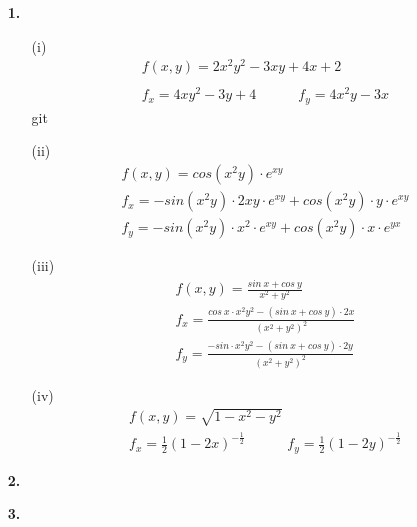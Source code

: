 \documentclass[a4paper,11pt]{article}
\title{\titleinfo}
\author{\authorinfotitle}
\date{\today}
\begin{document}
\maketitle
    \begin{enumerate}
        \item[\textbf{1.}]
        \begin{enumerate}
        	\item[(i)]
        	\begin{align*}
        &f(x,y) = 2x^2y^2-3xy+4x+2 \\ \\
        &f_x = 4xy^2 -3y + 4 \qquad \quad
        f_y = 4x^2y - 3x 
        	\end{align*}git 

        	\item[(ii)]
        	\begin{align*}
        &f(x,y) = cos(x^2y) \cdot e^{xy} \\[0.4cm]
        &f_x = -sin(x^2 y) \cdot 2xy \cdot e^{xy} + cos(x^2y) \cdot y \cdot e^{xy} \\[0.2cm]
        &f_y = -sin(x^2 y) \cdot x^2 \cdot e^{xy} + cos(x^2y) \cdot x \cdot e^{yx}	    
        	\end{align*}
       
        	\item[(iii)]
        	\begin{align*}
        &f(x,y) = \frac{sin \ x + cos \ y}{x^2 +y^2} \\[0.4cm]
        &f_x = \frac{cos \ x \cdot x^2y^2 - (sin \ x + cos \ y) \cdot 2x}{(x^2+y^2)^2} \\
        &f_y = \frac{-sin \cdot x^2y^2 - (sin \ x + cos \ y) \cdot 2y}{(x^2+y^2)^2} 
        	\end{align*}

        	\item[(iv)]
        	\begin{align*}
        &f(x,y) = \sqrt{1-x^2-y^2} \\[0.4cm]
       	&f_x = \frac{1}{2}(1-2x)^{-\frac{1}{2}} \qquad \quad
       	f_y = \frac{1}{2}(1-2y)^{-\frac{1}{2}} 
        	\end{align*}
       

        \end{enumerate}

        \item[\textbf{2.}]
        \todo
        \item[\textbf{3.}]


\end{enumerate}
\end{document}
